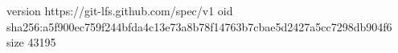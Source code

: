 version https://git-lfs.github.com/spec/v1
oid sha256:a5f900ec759f244bfda4c13e73a8b78f14763b7cbae5d2427a5cc7298db904f6
size 43195
